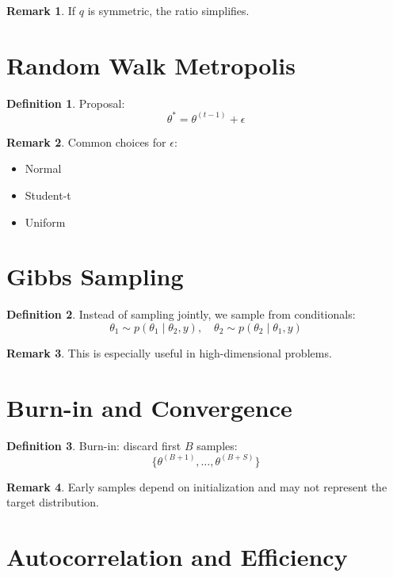 \documentclass[12pt,oneside]{book}
\numberwithin{equation}{section}
\theoremstyle{definition}
\newtheorem{definition}{Definition}[section]
\newtheorem{remark}{Remark}[section]
\theoremstyle{plain}
\theoremstyle{remark}
\begin{document}
\begin{remark}
If $q$ is symmetric, the ratio simplifies.
\end{remark}

\section{Random Walk Metropolis}

\begin{definition}
Proposal:
$$
\theta^* = \theta^{(t-1)} + \epsilon
$$
\end{definition}

\begin{remark}
Common choices for $\epsilon$:
\begin{itemize}
\item Normal
\item Student-t
\item Uniform
\end{itemize}
\end{remark}

\section{Gibbs Sampling}

\begin{definition}
Instead of sampling jointly, we sample from conditionals:
$$
\theta_1 \sim p(\theta_1 \mid \theta_2, y), \quad
\theta_2 \sim p(\theta_2 \mid \theta_1, y)
$$
\end{definition}

\begin{remark}
This is especially useful in high-dimensional problems.
\end{remark}

\section{Burn-in and Convergence}

\begin{definition}
Burn-in: discard first $B$ samples:
$$
\{\theta^{(B+1)},\dots,\theta^{(B+S)}\}
$$
\end{definition}

\begin{remark}
Early samples depend on initialization and may not represent the target distribution.
\end{remark}

\section{Autocorrelation and Efficiency}
\end{document}

